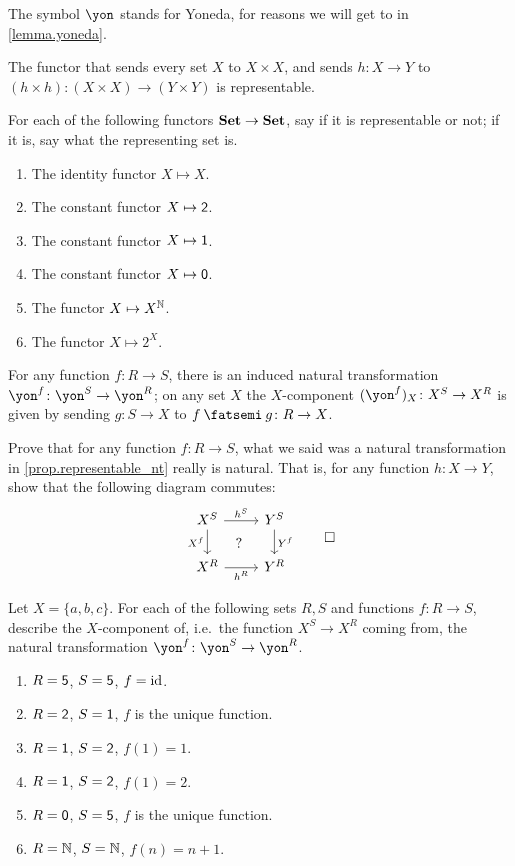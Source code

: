 \documentclass[DynamicalBook]{subfiles}
\begin{document}
The symbol $\yon$ stands for Yoneda, for reasons we will get to in \cref{lemma.yoneda}.

\begin{example}
The functor that sends every set $X$ to $X\times X$, and sends $h\colon X\to Y$ to $(h\times h)\colon (X\times X)\to(Y\times Y)$ is representable. 
\end{example}

\begin{exercise}
For each of the following functors $\textbf{Set}\to\textbf{Set}$, say if it is representable or not; if it is, say what the representing set is.
\begin{enumerate}
	\item The identity functor $X\mapsto X$.
	\item The constant functor $X\mapsto\textsf{2}$.
	\item The constant functor $X\mapsto\textsf{1}$.
	\item The constant functor $X\mapsto\textsf{0}$.
	\item The functor $X\mapsto X^{\mathbb{N}}$.
	\item The functor $X\mapsto 2^X$.
\qedhere
\end{enumerate}
\end{exercise}

\begin{proposition}\label{prop.representable_nt}
For any function $f\colon R\to S$, there is an induced natural transformation $\yon^f\colon\yon^S\to \yon^R$; on any set $X$ the $X$-component $(\yon^f)_X\colon X^S\to X^R$ is given by sending $g\colon S\to X$ to $f\then g\colon R\to X$.
\end{proposition}

\begin{exercise}
Prove that for any function $f\colon R\to S$, what we said was a natural transformation in \cref{prop.representable_nt} really is natural. That is, for any function $h\colon X\to Y$, show that the following diagram commutes:
\[
\begin{tikzcd}
	X^S\ar[r, "h^S"]\ar[d, "X^f"']&
	Y^S\ar[d, "Y^f"]\\
	X^R\ar[r, "h^R"']&
	Y^R\ar[ul, phantom, "?"]
\end{tikzcd}
\qedhere
\]
\end{exercise}

\begin{exercise}
Let $X=\{a,b,c\}$. For each of the following sets $R,S$ and functions $f\colon R\to S$, describe the $X$-component of, i.e.\ the function $X^S\to X^R$ coming from, the natural transformation $\yon^f\colon\yon^S\to\yon^R$.
\begin{enumerate}
	\item $R=\textsf{5}$, $S=\textsf{5}$, $f=\mathrm{id}$.
	\item $R=\textsf{2}$, $S=\textsf{1}$, $f$ is the unique function.
	\item $R=\textsf{1}$, $S=\textsf{2}$, $f(1)=1$.
	\item $R=\textsf{1}$, $S=\textsf{2}$, $f(1)=2$.
	\item $R=\textsf{0}$, $S=\textsf{5}$, $f$ is the unique function.
	\item $R=\mathbb{N}$, $S=\mathbb{N}$, $f(n)=n+1$.
\qedhere
\end{enumerate}
\end{exercise}
\end{document}
